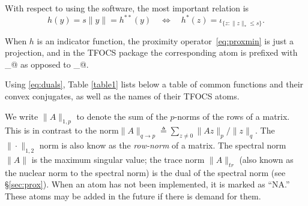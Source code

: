 \documentclass{article}
\newcommand{\<}{\langle}
\renewcommand{\>}{\rangle}
\begin{document}
With respect to using the software, the most important relation is
\begin{equation}\label{eq:duals}
h(y) = s \|y\| = h^{**}(y)  \quad \iff \quad h^*(z) = \iota_{ \{z: \|z\|_* \le s\} }.
\end{equation}

When $h$ is an indicator function, the proximity operator~\eqref{eq:proxmin}
is just a projection, and in the TFOCS package the corresponding atom
is prefixed with \verb@proj_@ as opposed to \verb@prox_@.

Using \eqref{eq:duals}, Table \ref{table1} lists below a table of common functions
and their convex conjugates, as well as the names of their TFOCS atoms.

We write $\|A\|_{1,p}$ to denote the sum of the $p$-norms of the rows of a matrix.
This is in contrast to the norm$\|A\|_{q\rightarrow p} \triangleq \sum_{z\neq0} \|Az\|_p/\|z\|_q$.  The $\|\cdot\|_{1,2}$ norm is also know as the \emph{row-norm} of a matrix.
The spectral norm $\|A\|$ is the maximum singular value; the trace norm $\|A\|_{tr}$ (also known as the nuclear norm to the spectral norm)
is the dual of the spectral norm (see \S\ref{sec:prox}).
When an atom has not been implemented, it is marked as ``NA.'' These atoms may be
added in the future if there is demand for them.
\end{document}
